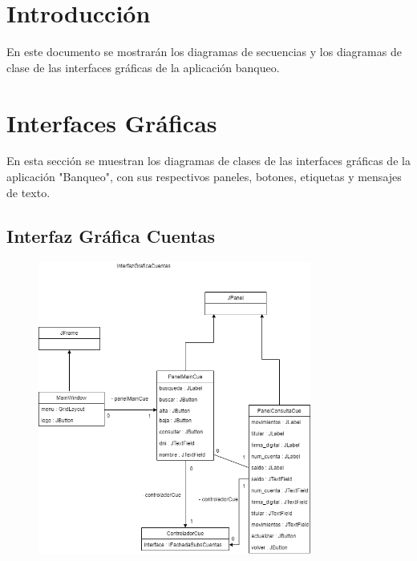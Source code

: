 \documentclass[12pt]{article}
\begin{document}
\section*{Introducción} %
En este documento se mostrarán los diagramas de secuencias y los diagramas de clase de las interfaces gráficas de la aplicación banqueo.

\section{Interfaces Gráficas} %
En esta sección se muestran los diagramas de clases de las interfaces gráficas de la aplicación "Banqueo", con sus respectivos paneles, botones, etiquetas y mensajes de texto.

\subsection{Interfaz Gráfica Cuentas}
\begin{figure}[H]
    \centering
    \includegraphics[width=0.8\textwidth]{InterfazGraficaCuentas1.png}
\end{figure}
\end{document}
